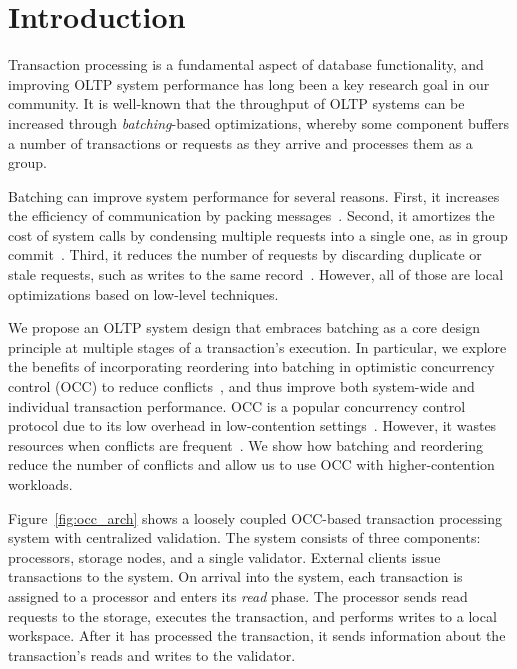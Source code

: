 \section{Introduction}\label{sec:intro}

Transaction processing is a fundamental aspect of database functionality, and improving OLTP system performance has long been a key research goal in our community. It is well-known that the throughput of OLTP systems can be increased through \emph{batching}-based optimizations, whereby some component buffers a number of transactions or requests as they arrive and processes them as a group.

Batching can improve system performance for several reasons. First, it increases the efficiency of communication by packing messages~\cite{ding2015centiman,friedman1997packing}. Second, it amortizes the cost of system calls by condensing multiple requests into a single one, as in group commit~\cite{debrabant2013anti,hagmann1987reimplementing}. Third, it reduces the number of requests by discarding duplicate or stale requests, such as writes to the same record~\cite{faleiro2014lazy}. However, all of those are local optimizations based on low-level techniques.

We propose an OLTP system design that embraces batching as a core design principle at multiple stages of a transaction's execution. In particular, we explore the benefits of incorporating reordering into batching in optimistic concurrency control (OCC) to reduce conflicts~\cite{kung81tods}, and thus improve both system-wide and individual transaction performance. OCC is a popular concurrency control protocol due to its low overhead in low-contention settings~\cite{adya97podc, baker11cidr, bernstein2015optimizing,bernstein11cidr, bernstein11vldb, corbett12osdi,warp, patterson12vldb,peng10osdi}. However, it wastes resources when conflicts are frequent~\cite{agrawal1987concurrency}. We show how batching and reordering reduce the number of conflicts and allow us to use OCC with higher-contention workloads.


Figure~\ref{fig:occ_arch} shows a loosely coupled OCC-based transaction processing system with centralized validation. The system consists of three components: processors, storage nodes, and a single validator. External clients issue transactions to the system. On arrival into the system, each transaction is assigned to a processor and enters its \emph{read} phase. The processor sends read requests to the storage, executes the transaction, and performs writes to a local workspace. After it has processed the transaction, it sends information about the transaction's reads and writes to the validator. 

